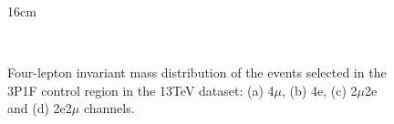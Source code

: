 \begin{figure}[htbp]{16cm}
	\caption{Four-lepton invariant mass distribution of the events selected in the 3P1F control region in the 13TeV dataset: (a) 4$\mu$, (b) 4e, (c) 2$\mu$2e and (d) 2e2$\mu$ channels.}
	\centering
	\\

\end{figure}
